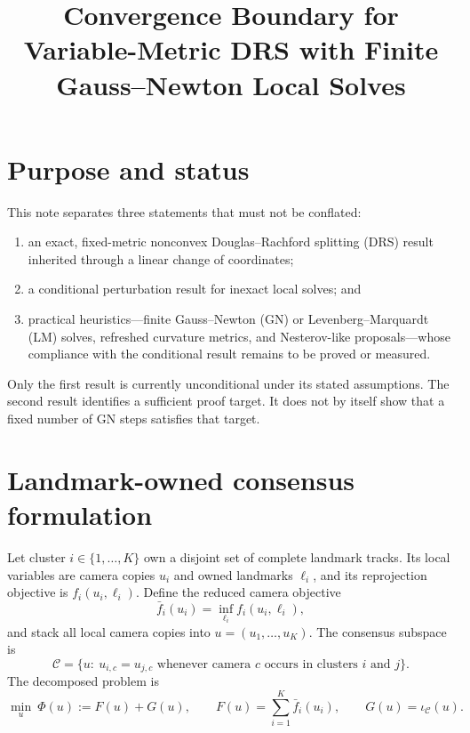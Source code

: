 \documentclass[11pt]{article}
\title{Convergence Boundary for Variable-Metric DRS with Finite Gauss--Newton Local Solves}
\author{}
\date{}
\newcommand{\Cset}{\mathcal{C}}
\begin{document}
\maketitle

\section{Purpose and status}

This note separates three statements that must not be conflated:
\begin{enumerate}
  \item an exact, fixed-metric nonconvex Douglas--Rachford splitting (DRS)
        result inherited through a linear change of coordinates;
  \item a conditional perturbation result for inexact local solves; and
  \item practical heuristics---finite Gauss--Newton (GN) or
        Levenberg--Marquardt (LM) solves, refreshed curvature metrics, and
        Nesterov-like proposals---whose compliance with the conditional result
        remains to be proved or measured.
\end{enumerate}

Only the first result is currently unconditional under its stated assumptions.
The second result identifies a sufficient proof target.  It does not by itself
show that a fixed number of GN steps satisfies that target.

\section{Landmark-owned consensus formulation}

Let cluster $i\in\{1,\ldots,K\}$ own a disjoint set of complete landmark
tracks.  Its local variables are camera copies $u_i$ and owned landmarks
$\ell_i$, and its reprojection objective is $f_i(u_i,\ell_i)$.  Define the
reduced camera objective
\begin{equation}
  \bar f_i(u_i)=\inf_{\ell_i} f_i(u_i,\ell_i),
  \label{eq:reduced-objective}
\end{equation}
and stack all local camera copies into $u=(u_1,\ldots,u_K)$.  The consensus
subspace is
\begin{equation}
  \Cset=\{u:\ u_{i,c}=u_{j,c}\text{ whenever camera }c
  \text{ occurs in clusters }i\text{ and }j\}.
\end{equation}
The decomposed problem is
\begin{equation}
  \min_u\ \Phi(u):=F(u)+G(u),
  \qquad
  F(u)=\sum_{i=1}^K\bar f_i(u_i),
  \qquad
  G(u)=\iota_{\Cset}(u).
  \label{eq:split-problem}
\end{equation}
\end{document}
